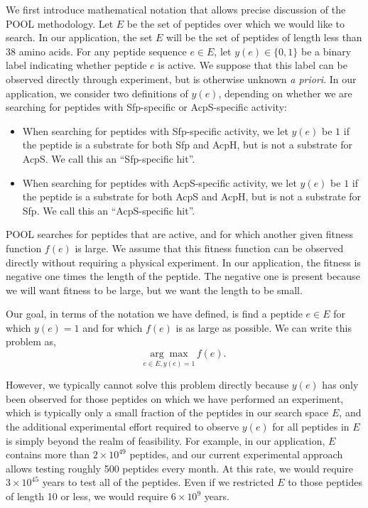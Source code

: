 We first introduce mathematical notation that allows precise discussion of the POOL methodology. Let $E$ be the set of peptides over which we would like to search.
In our application, the set $E$ will be the set of peptides of length less than 38 amino acids.
For any peptide sequence $e \in E$, let $y(e) \in \{0, 1\}$ be a binary label indicating whether
peptide $e$ is active.  We suppose that this label can be observed directly through experiment, but is otherwise unknown {\it a priori}.
In our application, we consider two definitions of $y(e)$, depending on whether we are searching for peptides with Sfp-specific or AcpS-specific activity:
\begin{itemize}
\item When searching for peptides with Sfp-specific activity, we let $y(e)$ be $1$ if the peptide is a substrate for both Sfp and AcpH, but is not a substrate for AcpS.  We call this an \enquote{Sfp-specific hit}.
\item When searching for peptides with AcpS-specific activity, we let $y(e)$ be $1$ if the peptide is a substrate for both AcpS and AcpH, but is not a substrate for Sfp.  We call this an \enquote{AcpS-specific hit}.
\end{itemize}

POOL searches for peptides that are active, and for which another given fitness function $f(e)$ is large.   We assume that this fitness function can be observed directly without requiring a physical experiment. In our application, the fitness is negative one times the length of the peptide.  The negative one is present because we will want fitness to be large, but we want the length to be small.

Our goal, in terms of the notation we have defined, is find a peptide $e\in E$ for which $y(e)=1$ and for which $f(e)$ is as large as possible.  We can write this problem as,
\begin{equation}
  \underset{e \in E, y(e) = 1}{\arg\max} \, f(e).
  \label{eq:general problem}
\end{equation}

However, we typically cannot solve this problem directly because $y(e)$ has only been observed for those peptides on which we have performed an experiment, which is typically only a small fraction of the peptides in our search space $E$, and the additional experimental effort required to observe $y(e)$ for all peptides in $E$ is simply beyond the realm of feasibility.  
For example, in our application, $E$ contains more than $2 \times 10^{49}$ peptides, and our current experimental approach allows testing roughly 500 peptides every month.  At this rate, we would require $3 \times 10^{45}$ years to test all of the peptides.
Even if we restricted $E$ to those peptides of length 10 or less, we would require $6 \times 10^{9}$ years.

